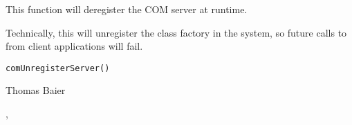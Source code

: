 \begin{Description}\relax
This function will deregister the COM server at runtime.

Technically, this will unregister the class factory in the system, so 
future calls to  from client applications will fail.
\end{Description}
\begin{Usage}
\begin{verbatim}
comUnregisterServer()
\end{verbatim}
\end{Usage}
\begin{Arguments}
\end{Arguments}
\begin{Author}\relax
Thomas Baier
\end{Author}
\begin{SeeAlso}\relax
{}, 
\end{SeeAlso}

